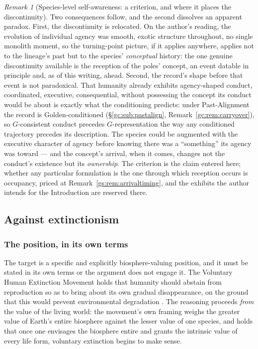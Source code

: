 \documentclass[11pt]{article}
\numberwithin{equation}{section}
\theoremstyle{plain}
\theoremstyle{definition}
\theoremstyle{remark}
\newtheorem{remark}[theorem]{Remark}
\begin{document}
\begin{remark}[Species-level self-awareness: a criterion, and where
it places the discontinuity]
Two consequences follow, and the second dissolves an apparent
paradox. First, the discontinuity is relocated. On the author's
reading, the evolution of individual agency was smooth, exotic
structure throughout, no single monolith moment, so the
turning-point picture, if it applies anywhere, applies not to the
lineage's past but to the species' \emph{conceptual} history: the
one genuine discontinuity available is the reception of the poles'
concept, an event datable in principle and, as of this writing,
ahead. Second, the record's shape before that event is not
paradoxical. That humanity already exhibits agency-shaped conduct, coordinated, executive, consequential, without possessing the
concept its conduct would be about is exactly what the conditioning
predicts: under Past-Alignment the record is Golden-conditioned
(\S\ref{gc:sub:pastalign}, Remark~\ref{gc:rem:carryover}), so
$G$-consistent conduct precedes $G$-representation the way any
conditioned trajectory precedes its description. The species could
be augmented with the executive character of agency before knowing
there was a ``something'' its agency was toward --- and the concept's
arrival, when it comes, changes not the conduct's existence but its
\emph{ownership}. The criterion is the claim entered here; whether
any particular formulation is the one through which reception occurs
is occupancy, priced at Remark~\ref{gs:rem:arrivaltiming}, and the
exhibits the author intends for the Introduction are reserved there.
\end{remark}

\subsection{Against extinctionism}\label{hr:sub:extinction}

\subsubsection{The position, in its own terms}\label{hr:subsub:position}

The target is a specific and explicitly biosphere-valuing position, and
it must be stated in its own terms or the argument does not engage it.
The Voluntary Human Extinction Movement holds that humanity should
abstain from reproduction so as to bring about its own gradual
disappearance, on the ground that this would prevent environmental
degradation \cite{VHEMT}. The reasoning proceeds \emph{from} the value
of the living world: the movement's own framing weighs the greater value
of Earth's entire biosphere against the lesser value of one species, and
holds that once one envisages the biosphere entire and grants the
intrinsic value of every life form, voluntary extinction begins to make
sense.
\end{document}
